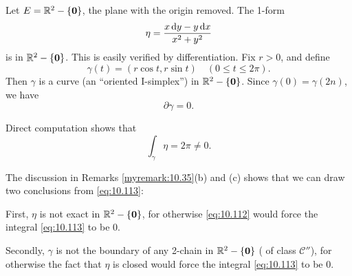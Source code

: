 \begin{newexample}
    \label{newexample:10.36}
    Let $E = {\protect\mathbb R}^2 - \{\mathbf{0}\}$, the plane with the origin removed. 
    The 1-form 
    \begin{equation}
        \label{eq:10.110}
        \eta = \frac{x \d y - y \d x}{x^2+y^2}
    \end{equation}
    is  in ${\protect\mathbb R}^2 - \{\mathbf{0}\}$.
    This is easily verified by differentiation.
    Fix $r>0$, and define 
    \begin{equation}
        \label{eq:10.11}
        \gamma(t) = (r \cos t, r \sin t)
        \quad 
        (0 \leq t \leq 2\pi).
    \end{equation}
    Then $\gamma$ is a curve (an ``oriented I-simplex'') in ${\protect\mathbb R}^2 - \{\mathbf{0}\}$. 
    Since $\gamma(0) = \gamma(2n)$,
    we have
    \begin{equation}
        \label{eq:10.112}
        \partial \gamma = 0 .
    \end{equation}

    Direct computation shows that
    \begin{equation}
        \label{eq:10.113}
        \int_{\gamma} \eta = 2\pi \neq 0 .
    \end{equation}

    The discussion in Remarks \ref{myremark:10.35}(b) and (c) shows that we can draw two conclusions from \eqref{eq:10.113}:

    First, $\eta$ is not exact in ${\protect\mathbb R}^2 - \{\mathbf{0}\}$, for otherwise \eqref{eq:10.112} would force the integral \eqref{eq:10.113} to be 0. 
    
    Secondly, $\gamma$ is not the boundary of any 2-chain in ${\protect\mathbb R}^2 - \{\mathbf{0}\}$ ( of class $\mathscr{C}''$), for otherwise the fact that $\eta$ is closed would force the integral \eqref{eq:10.113} to be 0.
\end{newexample}

